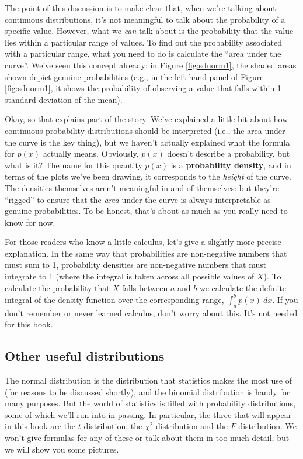 \documentclass[
]{book}
\theoremstyle{definition}
\theoremstyle{definition}
\theoremstyle{definition}
\theoremstyle{definition}
\theoremstyle{remark}
\begin{document}
The point of this discussion is to make clear that, when we're talking about continuous distributions, it's not meaningful to talk about the probability of a specific value. However, what we \emph{can} talk about is the probability that the value lies within a particular range of values. To find out the probability associated with a particular range, what you need to do is calculate the ``area under the curve''. We've seen this concept already: in Figure \ref{fig:sdnorm1}, the shaded areas shown depict genuine probabilities (e.g., in the left-hand panel of Figure \ref{fig:sdnorm1}, it shows the probability of observing a value that falls within 1 standard deviation of the mean).

Okay, so that explains part of the story. We've explained a little bit about how continuous probability distributions should be interpreted (i.e., the area under the curve is the key thing), but we haven't actually explained what the formula for \(p(x)\) actually means. Obviously, \(p(x)\) doesn't describe a probability, but what is it? The name for this quantity \(p(x)\) is a \textbf{probability density}, and in terms of the plots we've been drawing, it corresponds to the \emph{height} of the curve. The densities themselves aren't meaningful in and of themselves: but they're ``rigged'' to ensure that the \emph{area} under the curve is always interpretable as genuine probabilities. To be honest, that's about as much as you really need to know for now.

For those readers who know a little calculus, let's give a slightly more precise explanation. In the same way that probabilities are non-negative numbers that must sum to 1, probability densities are non-negative numbers that must integrate to 1 (where the integral is taken across all possible values of \(X\)). To calculate the probability that \(X\) falls between \(a\) and \(b\) we calculate the definite integral of the density function over the corresponding range, \(\int_a^b p(x) \ dx\). If you don't remember or never learned calculus, don't worry about this. It's not needed for this book.

\hypertarget{otherdists}{%
\subsection{Other useful distributions}\label{otherdists}}

The normal distribution is the distribution that statistics makes the most use of (for reasons to be discussed shortly), and the binomial distribution is handy for many purposes. But the world of statistics is filled with probability distributions, some of which we'll run into in passing. In particular, the three that will appear in this book are the \(t\) distribution, the \(\chi^2\) distribution and the \(F\) distribution. We won't give formulas for any of these or talk about them in too much detail, but we will show you some pictures.
\end{document}
